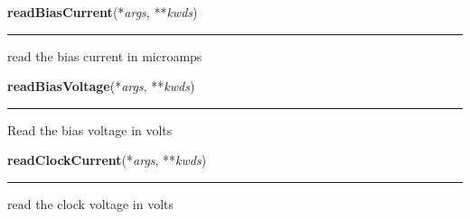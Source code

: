     \label{dsp:readBiasCurrent}

    \vspace{0.5ex}

    \begin{boxedminipage}{\textwidth}

    \raggedright \textbf{readBiasCurrent}(*\textit{args}, **\textit{kwds})

    \vspace{-1.5ex}

    \rule{\textwidth}{0.5\fboxrule}
    read the bias current in microamps

    \vspace{1ex}

    \end{boxedminipage}

    \label{dsp:readBiasVoltage}

    \vspace{0.5ex}

    \begin{boxedminipage}{\textwidth}

    \raggedright \textbf{readBiasVoltage}(*\textit{args}, **\textit{kwds})

    \vspace{-1.5ex}

    \rule{\textwidth}{0.5\fboxrule}
    Read the bias voltage in volts

    \vspace{1ex}

    \end{boxedminipage}

    \label{dsp:readClockCurrent}

    \vspace{0.5ex}

    \begin{boxedminipage}{\textwidth}

    \raggedright \textbf{readClockCurrent}(*\textit{args}, **\textit{kwds})

    \vspace{-1.5ex}

    \rule{\textwidth}{0.5\fboxrule}
    read the clock voltage in volts

    \vspace{1ex}

    \end{boxedminipage}

